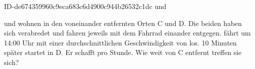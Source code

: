 \begin{exercise}
      {ID-de674359960c9eca683c6d4900c944b26532c1dc}
      {\xyc{} und \xyd}
  \ifproblem\problem\par
    \xyc{} und \xyd{} wohnen in den  voneinander entfernten Orten C und D.
    Die beiden haben sich verabredet und fahren jeweils mit dem Fahrrad einander
    entgegen. \xyc{} fährt um 14:00 Uhr mit einer durchschnittlichen Geschwindigkeit
    von  los. 10 Minuten später startet \xyd{} in D. Er schafft 
    pro Stunde. Wie weit von C entfernt treffen sie sich?
  \fi
\end{exercise}

